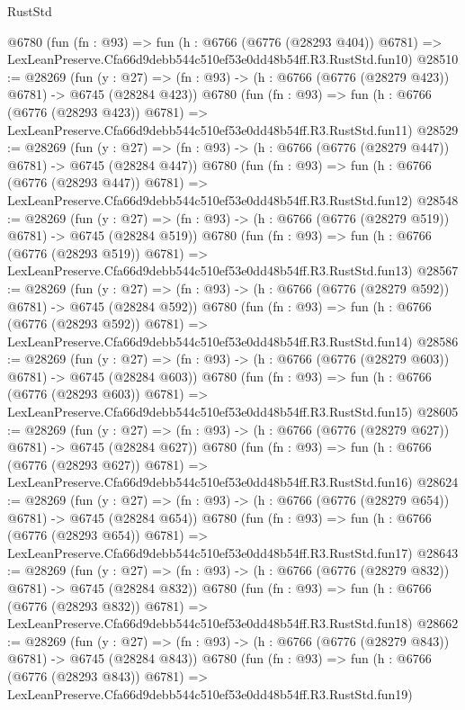 \begin{lexlean}{RustStd}
\begin{coremodule}
    @6780
    (fun (fn : @93) =>
    fun (h : @6766 (@6776 (@28293 @404)) @6781) =>
    LexLeanPreserve.Cfa66d9debb544c510ef53e0dd48b54ff.R3.RustStd.fun10)
@28510 := @28269
    (fun (y : @27) => (fn : @93) -> (h : @6766 (@6776 (@28279 @423)) @6781) -> @6745 (@28284 @423))
    @6780
    (fun (fn : @93) =>
    fun (h : @6766 (@6776 (@28293 @423)) @6781) =>
    LexLeanPreserve.Cfa66d9debb544c510ef53e0dd48b54ff.R3.RustStd.fun11)
@28529 := @28269
    (fun (y : @27) => (fn : @93) -> (h : @6766 (@6776 (@28279 @447)) @6781) -> @6745 (@28284 @447))
    @6780
    (fun (fn : @93) =>
    fun (h : @6766 (@6776 (@28293 @447)) @6781) =>
    LexLeanPreserve.Cfa66d9debb544c510ef53e0dd48b54ff.R3.RustStd.fun12)
@28548 := @28269
    (fun (y : @27) => (fn : @93) -> (h : @6766 (@6776 (@28279 @519)) @6781) -> @6745 (@28284 @519))
    @6780
    (fun (fn : @93) =>
    fun (h : @6766 (@6776 (@28293 @519)) @6781) =>
    LexLeanPreserve.Cfa66d9debb544c510ef53e0dd48b54ff.R3.RustStd.fun13)
@28567 := @28269
    (fun (y : @27) => (fn : @93) -> (h : @6766 (@6776 (@28279 @592)) @6781) -> @6745 (@28284 @592))
    @6780
    (fun (fn : @93) =>
    fun (h : @6766 (@6776 (@28293 @592)) @6781) =>
    LexLeanPreserve.Cfa66d9debb544c510ef53e0dd48b54ff.R3.RustStd.fun14)
@28586 := @28269
    (fun (y : @27) => (fn : @93) -> (h : @6766 (@6776 (@28279 @603)) @6781) -> @6745 (@28284 @603))
    @6780
    (fun (fn : @93) =>
    fun (h : @6766 (@6776 (@28293 @603)) @6781) =>
    LexLeanPreserve.Cfa66d9debb544c510ef53e0dd48b54ff.R3.RustStd.fun15)
@28605 := @28269
    (fun (y : @27) => (fn : @93) -> (h : @6766 (@6776 (@28279 @627)) @6781) -> @6745 (@28284 @627))
    @6780
    (fun (fn : @93) =>
    fun (h : @6766 (@6776 (@28293 @627)) @6781) =>
    LexLeanPreserve.Cfa66d9debb544c510ef53e0dd48b54ff.R3.RustStd.fun16)
@28624 := @28269
    (fun (y : @27) => (fn : @93) -> (h : @6766 (@6776 (@28279 @654)) @6781) -> @6745 (@28284 @654))
    @6780
    (fun (fn : @93) =>
    fun (h : @6766 (@6776 (@28293 @654)) @6781) =>
    LexLeanPreserve.Cfa66d9debb544c510ef53e0dd48b54ff.R3.RustStd.fun17)
@28643 := @28269
    (fun (y : @27) => (fn : @93) -> (h : @6766 (@6776 (@28279 @832)) @6781) -> @6745 (@28284 @832))
    @6780
    (fun (fn : @93) =>
    fun (h : @6766 (@6776 (@28293 @832)) @6781) =>
    LexLeanPreserve.Cfa66d9debb544c510ef53e0dd48b54ff.R3.RustStd.fun18)
@28662 := @28269
    (fun (y : @27) => (fn : @93) -> (h : @6766 (@6776 (@28279 @843)) @6781) -> @6745 (@28284 @843))
    @6780
    (fun (fn : @93) =>
    fun (h : @6766 (@6776 (@28293 @843)) @6781) =>
    LexLeanPreserve.Cfa66d9debb544c510ef53e0dd48b54ff.R3.RustStd.fun19)

\end{coremodule}
\end{lexlean}
